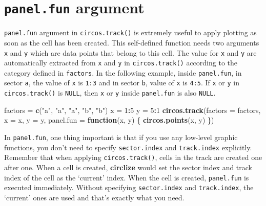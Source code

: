 \documentclass[]{book}
\newenvironment{Shaded}{\begin{snugshade}}{\end{snugshade}}
\newcommand{\KeywordTok}[1]{\textcolor[rgb]{0.13,0.29,0.53}{\textbf{#1}}}
\newcommand{\DataTypeTok}[1]{\textcolor[rgb]{0.13,0.29,0.53}{#1}}
\newcommand{\DecValTok}[1]{\textcolor[rgb]{0.00,0.00,0.81}{#1}}
\newcommand{\StringTok}[1]{\textcolor[rgb]{0.31,0.60,0.02}{#1}}
\newcommand{\ControlFlowTok}[1]{\textcolor[rgb]{0.13,0.29,0.53}{\textbf{#1}}}
\newcommand{\OperatorTok}[1]{\textcolor[rgb]{0.81,0.36,0.00}{\textbf{#1}}}
\newcommand{\NormalTok}[1]{#1}
\theoremstyle{definition}
\theoremstyle{definition}
\theoremstyle{remark}
\begin{document}
\section{\texorpdfstring{\texttt{panel.fun}
argument}{panel.fun argument}}\label{panel-fun}

\texttt{panel.fun} argument in \texttt{circos.track()} is extremely
useful to apply plotting as soon as the cell has been created. This
self-defined function needs two arguments \texttt{x} and \texttt{y}
which are data points that belong to this cell. The value for \texttt{x}
and \texttt{y} are automatically extracted from \texttt{x} and
\texttt{y} in \texttt{circos.track()} according to the category defined
in \texttt{factors}. In the following example, inside
\texttt{panel.fun}, in sector \texttt{a}, the value of \texttt{x} is
\texttt{1:3} and in sector \texttt{b}, value of \texttt{x} is
\texttt{4:5}. If \texttt{x} or \texttt{y} in \texttt{circos.track()} is
\texttt{NULL}, then \texttt{x} or \texttt{y} inside \texttt{panel.fun}
is also \texttt{NULL}.

\begin{Shaded}
\begin{Highlighting}[]
\NormalTok{factors =}\StringTok{ }\KeywordTok{c}\NormalTok{(}\StringTok{"a"}\NormalTok{, }\StringTok{"a"}\NormalTok{, }\StringTok{"a"}\NormalTok{, }\StringTok{"b"}\NormalTok{, }\StringTok{"b"}\NormalTok{)}
\NormalTok{x =}\StringTok{ }\DecValTok{1}\OperatorTok{:}\DecValTok{5}
\NormalTok{y =}\StringTok{ }\DecValTok{5}\OperatorTok{:}\DecValTok{1}
\KeywordTok{circos.track}\NormalTok{(}\DataTypeTok{factors =}\NormalTok{ factors, }\DataTypeTok{x =}\NormalTok{ x, }\DataTypeTok{y =}\NormalTok{ y,}
    \DataTypeTok{panel.fun =} \ControlFlowTok{function}\NormalTok{(x, y) \{}
        \KeywordTok{circos.points}\NormalTok{(x, y)}
\NormalTok{\})}
\end{Highlighting}
\end{Shaded}

In \texttt{panel.fun}, one thing important is that if you use any
low-level graphic functions, you don't need to specify
\texttt{sector.index} and \texttt{track.index} explicitly. Remember that
when applying \texttt{circos.track()}, cells in the track are created
one after one. When a cell is created, \textbf{circlize} would set the
sector index and track index of the cell as the `current' index. When
the cell is created, \texttt{panel.fun} is executed immediately. Without
specifying \texttt{sector.index} and \texttt{track.index}, the `current'
ones are used and that's exactly what you need.
\end{document}
